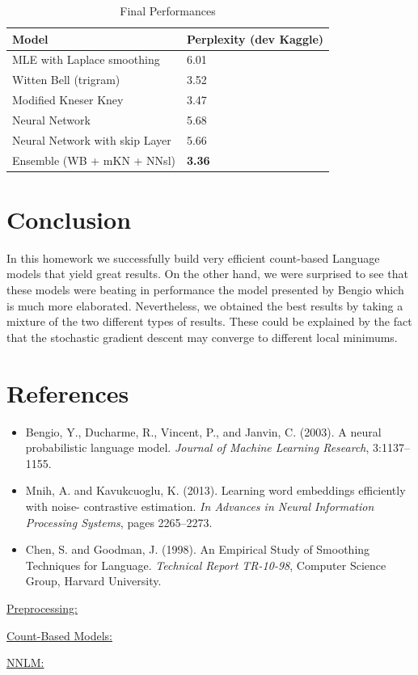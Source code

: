 \documentclass[11pt]{article}
\begin{document}
\begin{table}[H]
\centering
\caption{Final Performances}
\label{my-label}
\begin{tabular}{|l|l|}
\hline
Model                          & Perplexity (dev Kaggle) \\ \hline
MLE with Laplace smoothing     & 6.01                    \\ \hline
Witten Bell (trigram)          & 3.52                    \\ \hline
Modified Kneser Kney           & 3.47                    \\ \hline
Neural Network                 & 5.68                    \\ \hline
Neural Network with skip Layer & 5.66                    \\ \hline
Ensemble (WB + mKN + NNsl)     & \textbf{3.36}                    \\ \hline
\end{tabular}
\end{table}


\section{Conclusion}

In this homework we successfully build very efficient count-based Language models that yield great results. On the other hand, we were surprised to see that these models were beating in performance the model presented by Bengio which is much more elaborated. Nevertheless, we obtained the best results by taking a mixture of the two different types of results. These could be explained by the fact that the stochastic gradient descent may converge to different local minimums. 

\section{References}
\begin{itemize}
\item Bengio, Y., Ducharme, R., Vincent, P., and Janvin, C. (2003). A neural probabilistic language model. \emph{Journal of Machine Learning Research}, 3:1137–1155.

\item Mnih, A. and Kavukcuoglu, K. (2013). Learning word embeddings efficiently with noise- contrastive estimation. \emph{In Advances in Neural Information Processing Systems}, pages 2265–2273.

\item Chen, S. and Goodman, J. (1998). An Empirical Study of Smoothing Techniques for Language. \emph{Technical Report TR-10-98}, Computer Science Group, Harvard University.
\end{itemize}

\newpage

\begin{appendices}
\underline{Preprocessing:}

\underline{Count-Based Models:}

\underline{NNLM:}

\end{appendices}
\end{document}
